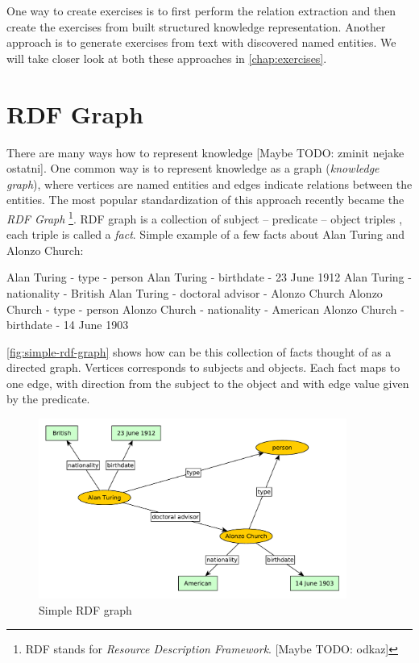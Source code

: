 \documentclass[a4paper, 12pt, twoside]{fithesis2}		%
\renewcommand{\_}{\leavevmode \kern0.07em\vbox{\hrule width0.4em}}
\begin{document}
One way to create exercises is to first perform the relation extraction and then create the exercises from built structured knowledge representation. Another approach is to generate exercises from text with discovered named entities. We will take closer look at both these approaches in \autoref{chap:exercises}.


\section{RDF Graph}
\label{sec:rdf-graph}

There are many ways how to represent knowledge [Maybe TODO: zminit nejake ostatni].
One common way is to represent knowledge as a graph (\textit{knowledge graph}), where vertices are named entities
and edges indicate relations between the entities.
The most popular standardization of this approach recently became the \textit{RDF Graph}%
\footnote{RDF stands for \textit{Resource Description Framework}. [Maybe TODO: odkaz]}.
RDF graph is a collection of subject -- predicate -- object triples \parencite[][63]{semantic-web},
each triple is called a \textit{fact}. Simple example of a few facts about Alan Turing and Alonzo Church:

\begin{code}
Alan Turing - type - person
Alan Turing - birthdate - 23 June 1912
Alan Turing - nationality - British
Alan Turing - doctoral advisor - Alonzo Church
Alonzo Church - type - person
Alonzo Church - nationality - American
Alonzo Church - birthdate - 14 June 1903
\end{code}

\autoref{fig:simple-rdf-graph} shows how can be this collection of facts thought of as a directed graph.
Vertices corresponds to subjects and objects. Each fact maps to one edge, with direction from the subject to the object and with edge value given by the predicate.

\begin{figure}[h]
  \centering
  \includegraphics[width=0.9\textwidth]{images/rdf-graph.pdf}
  \caption{Simple RDF graph}
  \label{fig:simple-rdf-graph}
\end{figure}
\end{document}

